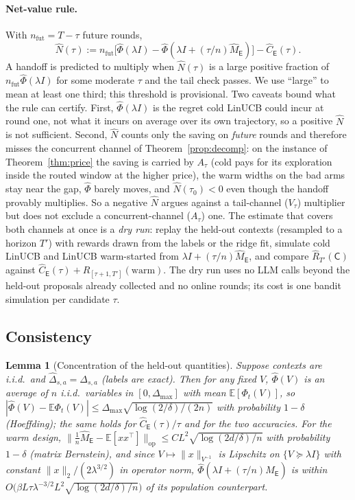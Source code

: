\documentclass{article}
\newtheorem{lemma}{Lemma}
\theoremstyle{definition}
\theoremstyle{remark}
\newcommand{\E}{\mathbb{E}}
\theoremstyle{remark}
\newcommand{\Cold}{\mathsf{C}}
\newcommand{\Exp}{\mathsf{E}}
\begin{document}
\paragraph{Net-value rule.} With $n_{\mathrm{fut}}=T-\tau$ future rounds,
\[
\widehat N(\tau):=n_{\mathrm{fut}}\bigl[\widehat\Phi(\lambda I)-\widehat\Phi(\lambda I+(\tau/n)\widehat M_{\Exp})\bigr]-\widehat C_{\Exp}(\tau).
\]
A handoff is predicted to multiply when $\widehat N(\tau)$ is a large
positive fraction of $n_{\mathrm{fut}}\widehat\Phi(\lambda I)$ for some
moderate $\tau$ and the tail check passes. We use ``large'' to mean at least
one third; this threshold is provisional. Two caveats bound what the rule
can certify. First, $\widehat\Phi(\lambda I)$ is the regret cold LinUCB could
incur at round one, not what it incurs on average over its own trajectory,
so a positive $\widehat N$ is not sufficient. Second, $\widehat N$ counts only
the saving on \emph{future} rounds and therefore misses the concurrent
channel of Theorem~\ref{prop:decomp}: on the instance of
Theorem~\ref{thm:price} the saving is carried by $A_\tau$ (cold pays for its
exploration inside the routed window at the higher price), the warm widths on
the bad arms stay near the gap, $\widehat\Phi$ barely moves, and
$\widehat N(\tau_0)<0$ even though the handoff provably multiplies. So a
negative $\widehat N$ argues against a tail-channel ($V_\tau$) multiplier but
does not exclude a concurrent-channel ($A_\tau$) one. The estimate that
covers both channels at once is a \emph{dry run}: replay the held-out
contexts (resampled to a horizon $T'$) with rewards drawn from the labels or
the ridge fit, simulate cold LinUCB and LinUCB warm-started from
$\lambda I+(\tau/n)\widehat M_{\Exp}$, and compare
$\widehat R_{T'}(\Cold)$ against
$\widehat C_{\Exp}(\tau)+\widehat R_{[\tau+1,T']}(\mathrm{warm})$. The dry run
uses no LLM calls beyond the held-out proposals already collected and no
online rounds; its cost is one bandit simulation per candidate $\tau$.

\subsection{Consistency}
\label{app:consistency}

\begin{lemma}[Concentration of the held-out quantities]
\label{lem:diag-concentration}
Suppose contexts are i.i.d.\ and $\widehat\Delta_{s,a}=\Delta_{s,a}$ (labels are
exact). Then for any fixed $V$, $\widehat\Phi(V)$ is an average of $n$ i.i.d.\
variables in $[0,\Delta_{\max}]$ with mean $\E[\Phi_t(V)]$, so
$|\widehat\Phi(V)-\E\Phi_t(V)|\le\Delta_{\max}\sqrt{\log(2/\delta)/(2n)}$ with
probability $1-\delta$ (Hoeffding); the same holds for
$\widehat C_{\Exp}(\tau)/\tau$ and for the two accuracies. For the warm design,
$\|\tfrac1n\widehat M_{\Exp}-\E[xx^\top]\|_{\mathrm{op}}\le CL^2\sqrt{\log(2d/\delta)/n}$
with probability $1-\delta$ (matrix Bernstein), and since
$V\mapsto\|x\|_{V^{-1}}$ is Lipschitz on $\{V\succeq\lambda I\}$ with constant
$\|x\|_2/(2\lambda^{3/2})$ in operator norm, $\widehat\Phi(\lambda I+(\tau/n)\widehat M_{\Exp})$
is within $O\bigl(\beta L\tau\lambda^{-3/2}L^2\sqrt{\log(2d/\delta)/n}\bigr)$ of
its population counterpart.
\end{lemma}
\end{document}
